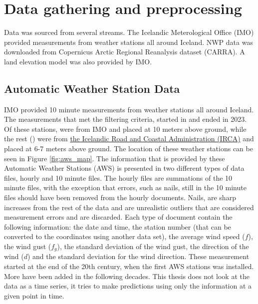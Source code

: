 
\chapter{Data gathering and preprocessing}
\label{Chapter2}
Data was sourced from several streams. The Icelandic Meterological Office (IMO) provided measurements from weather stations all around Iceland. NWP data was downloaded from Copernicus Arctic Regional Reanalysis dataset (CARRA). A land elevation model was also provided by IMO.

\section{Automatic Weather Station Data}

IMO provided 10 minute measurements from \nStationsMin weather stations all around Iceland. The measurements that met the filtering criteria, started in \startDateVedur and ended in 2023. Of these \nStationsMin stations, \nVedurMin were from IMO and placed at 10 meters above ground, while the rest (\nVGMin) were from \href{https://www.vegagerdin.is/}{the Icelandic Road and Coastal Administration (IRCA)} and placed at 6-7 meters above ground\cite{vegagerdin_postur}. The location of these weather stations can be seen in Figure \ref{fig:aws_map}. The information that is provided by these Automatic Weather Stations (AWS) is presented in two different types of data files, hourly and 10 minute files. The hourly files are summations of the 10 minute files, with the exception that errors, such as nails, still in the 10 minute files should have been removed from the hourly documents. Nails, are sharp increases from the rest of the data and are unrealistic outliers that are considered measurement errors and are discarded. Each type of document contain the following information: the date and time, the station number (that can be converted to the coordinates using another data set), the average wind speed ($f$), the wind gust ($f_g$), the standard deviation of the wind gust, the direction of the wind ($d$) and the standard deviation for the wind direction. These measurement started at the end of the 20th century, when the first AWS stations was installed. More have been added in the following decades. This thesis does not look at the data as a time series, it tries to make predictions using only the information at a given point in time.

